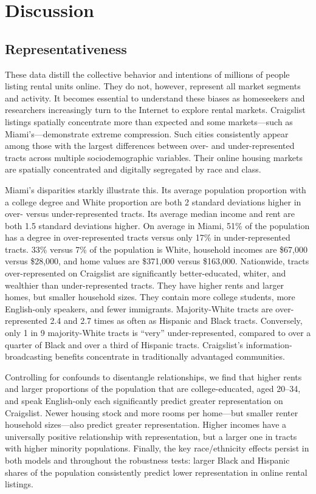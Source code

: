 \documentclass[11pt,letterpaper]{article}
\begin{document}
\section{Discussion}

\subsection{Representativeness}

These data distill the collective behavior and intentions of millions of people listing rental units online. They do not, however, represent all market segments and activity. It becomes essential to understand these biases as homeseekers and researchers increasingly turn to the Internet to explore rental markets. Craigslist listings spatially concentrate more than expected and some markets---such as Miami's---demonstrate extreme compression. Such cities consistently appear among those with the largest differences between over- and under-represented tracts across multiple sociodemographic variables. Their online housing markets are spatially concentrated and digitally segregated by race and class.

Miami's disparities starkly illustrate this. Its average population proportion with a college degree and White proportion are both 2 standard deviations higher in over- versus under-represented tracts. Its average median income and rent are both 1.5 standard deviations higher. On average in Miami, 51\% of the population has a degree in over-represented tracts versus only 17\% in under-represented tracts. 33\% versus 7\% of the population is White, household incomes are \$67,000 versus \$28,000, and home values are \$371,000 versus \$163,000. Nationwide, tracts over-represented on Craigslist are significantly better-educated, whiter, and wealthier than under-represented tracts. They have higher rents and larger homes, but smaller household sizes. They contain more college students, more English-only speakers, and fewer immigrants. Majority-White tracts are over-represented 2.4 and 2.7 times as often as Hispanic and Black tracts. Conversely, only 1 in 9 majority-White tracts is \enquote{very} under-represented, compared to over a quarter of Black and over a third of Hispanic tracts. Craigslist's information-broadcasting benefits concentrate in traditionally advantaged communities.

Controlling for confounds to disentangle relationships, we find that higher rents and larger proportions of the population that are college-educated, aged 20--34, and speak English-only each significantly predict greater representation on Craigslist. Newer housing stock and more rooms per home---but smaller renter household sizes---also predict greater representation. Higher incomes have a universally positive relationship with representation, but a larger one in tracts with higher minority populations. Finally, the key race/ethnicity effects persist in both models and throughout the robustness tests: larger Black and Hispanic shares of the population consistently predict lower representation in online rental listings.
\end{document}
